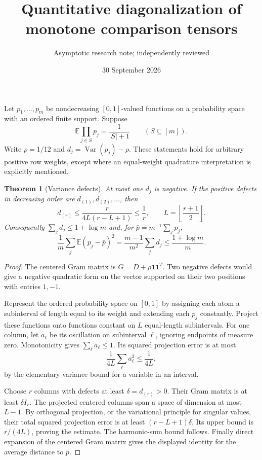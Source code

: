 \documentclass[11pt]{article}
\title{Quantitative diagonalization of monotone comparison tensors}
\author{Asymptotic research note; independently reviewed}
\date{30 September 2026}
\newtheorem{theorem}{Theorem}
\newcommand{\E}{\mathbb E}
\newcommand{\Var}{\operatorname{Var}}
\begin{document}
\maketitle
Let $p_1,\ldots,p_m$ be nondecreasing $[0,1]$-valued functions on a
probability space with an ordered finite support. Suppose
\[
 \E\prod_{j\in S}p_j=\frac1{|S|+1}\qquad(S\subseteq[m]).
\]
Write $\rho=1/12$ and $d_j=\Var(p_j)-\rho$.
These statements hold for arbitrary positive row weights, except where
an equal-weight quadrature interpretation is explicitly mentioned.

\begin{theorem}[Variance defects]
At most one $d_j$ is negative. If the positive defects in decreasing
order are $d_{(1)},d_{(2)},\ldots$, then
\[
 d_{(r)}\le\frac{r}{4L(r-L+1)}\le\frac1r,
 \qquad L=\left\lfloor\frac{r+1}{2}\right\rfloor.
\]
Consequently $\sum_j d_j\le 1+\log m$ and, for
$\bar p=m^{-1}\sum_j p_j$,
\[
 \frac1m\sum_j\E(p_j-\bar p)^2
 =\frac{m-1}{m^2}\sum_j d_j
 \le\frac{1+\log m}{m}.
\]
\end{theorem}
\begin{proof}
The centered Gram matrix is $G=D+\rho\mathbf1\mathbf1^T$.
Two negative defects would give a negative quadratic form on the
vector supported on their two positions with entries $1,-1$.

Represent the ordered probability space on $[0,1]$ by assigning each
atom a subinterval of length equal to its weight and extending each
$p_j$ constantly. Project these functions onto functions constant on
$L$ equal-length subintervals. For one column, let $a_\ell$ be its
oscillation on subinterval $\ell$, ignoring endpoints of measure zero.
Monotonicity gives $\sum_\ell a_\ell\le1$. Its squared projection
error is at most
\[
 \frac1{4L}\sum_\ell a_\ell^2\le\frac1{4L},
\]
by the elementary variance bound for a variable in an interval.

Choose $r$ columns with defects at least $\delta=d_{(r)}>0$.
Their Gram matrix is at least $\delta I_r$. The projected centered
columns span a space of dimension at most $L-1$. By orthogonal
projection, or the variational principle for singular values, their
total squared projection error is at least $(r-L+1)\delta$.
Its upper bound is $r/(4L)$, proving the estimate. The harmonic-sum
bound follows. Finally direct expansion of the centered Gram matrix
gives the displayed identity for the average distance to $\bar p$.
\end{proof}
\end{document}
